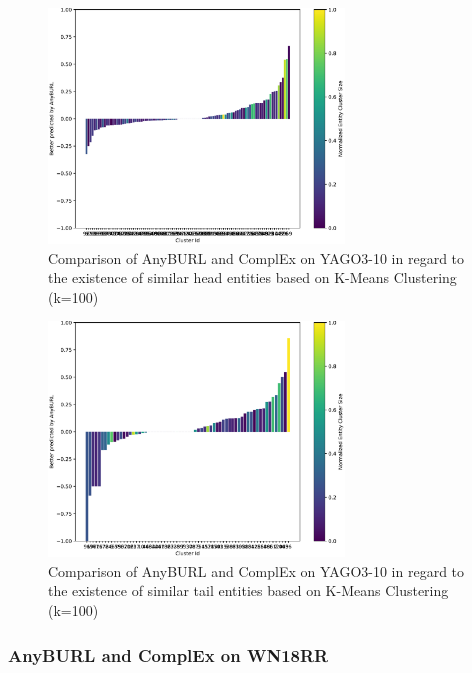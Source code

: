 \begin{figure}[H]
\centering
\includegraphics[width=0.7\textwidth]{images/head_cluster_100_anyburl_complex_yago.PNG}
\caption{Comparison of AnyBURL and ComplEx on YAGO3-10 in regard to the existence of similar head entities based on K-Means Clustering (k=100)}
\label{fig:head_cluster_100_anyburl_complex_yago}
\end{figure}

\begin{figure}[H]
\centering
\includegraphics[width=0.7\textwidth]{images/tail_cluster_100_anyburl_complex_yago.PNG}
\caption{Comparison of AnyBURL and ComplEx on YAGO3-10 in regard to the existence of similar tail entities based on K-Means Clustering (k=100)}
\label{fig:tail_cluster_100_anyburl_complex_yago}
\end{figure}

\subsubsection{AnyBURL and ComplEx on WN18RR}

